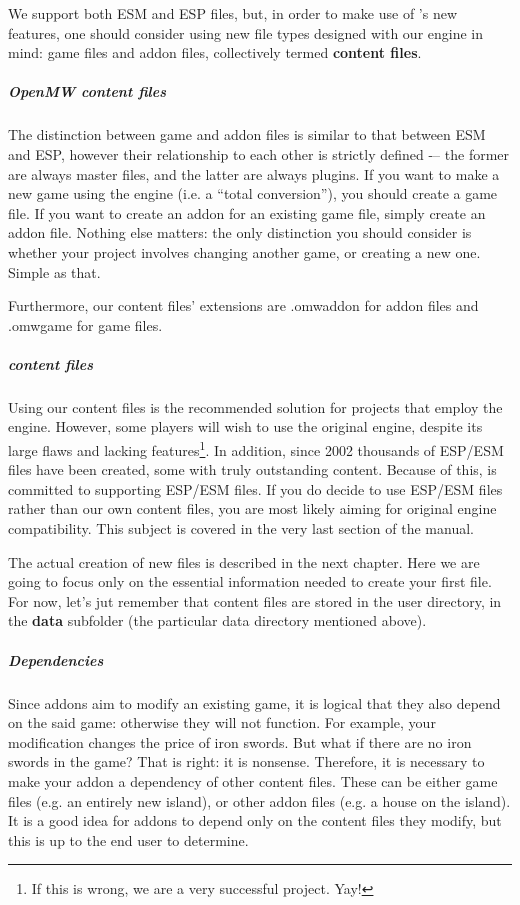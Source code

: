 We support both ESM and ESP files, but, in order to make use of \OMW{}'s new features, one should consider using new file types designed
with our engine in mind: game files and addon files, collectively termed \textbf{content files}.

\subparagraph{OpenMW content files}
The distinction between game and addon files is similar to that between ESM and ESP, however their relationship to each other is
strictly defined -– the former are always master files, and the latter are always plugins. If you want to make a new game using the \OMW{}
engine (i.e. a ``total conversion''), you should create a game file. If you want to create an addon for an existing game file, simply
create an addon file. Nothing else matters: the only distinction you should consider is whether your project involves changing another game, 
or creating a new one. Simple as that.

Furthermore, our content files’ extensions are .omwaddon for addon files and .omwgame for game files.

\subparagraph{\MW{} content files}
Using our content files is the recommended solution for projects that employ the \OMW{} engine. However, some players will wish to use 
the original \MW{} engine, despite its large flaws and lacking features\footnote{If this is wrong, we are a very successful project. Yay!}. 
In addition, since 2002 thousands of ESP/ESM files have been created, some with truly outstanding content. Because of this, \OCS{} is
committed to supporting ESP/ESM files. If you do decide to use ESP/ESM files rather than our own content files, you are most likely aiming
for original engine compatibility. This subject is covered in the very last section of the manual. 

The actual creation of new files is described in the next chapter. Here we are going to focus only on the essential information needed
to create your first \OCS{} file. For now, let's jut remember that content files are stored in the user directory, in the \textbf{data}
subfolder (the particular data directory mentioned above).

\subparagraph{Dependencies}
Since addons aim to modify an existing game, it is logical that they also depend on the said game: otherwise they will not function.
For example, your modification changes the price of iron swords. But what if there are no iron swords in the game? That is right:
it is nonsense. Therefore, it is necessary to make your addon a dependency of other content files. These can be either game files
(e.g. an entirely new island), or other addon files (e.g. a house on the island). It is a good idea for addons to depend only on the
content files they modify, but this is up to the end user to determine.

